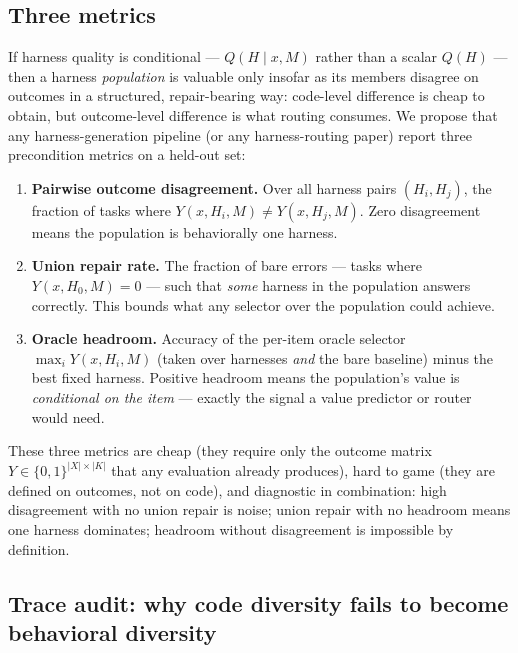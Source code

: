 \subsection{Three metrics}\label{three-metrics}
If harness quality is conditional --- \(Q(H \mid x, M)\) rather than a
scalar \(Q(H)\) --- then a harness \emph{population} is valuable only
insofar as its members disagree on outcomes in a structured,
repair-bearing way: code-level difference is cheap to obtain, but
outcome-level difference is what routing consumes. We propose that any
harness-generation pipeline (or any harness-routing paper) report three
precondition metrics on a held-out set:
\begin{enumerate}
\def\labelenumi{\arabic{enumi}.}
\tightlist
\item
  \textbf{Pairwise outcome disagreement.} Over all harness pairs
  \((H_i, H_j)\), the fraction of tasks where
  \(Y(x,H_i,M) \neq Y(x,H_j,M)\). Zero disagreement means the population
  is behaviorally one harness.
\item
  \textbf{Union repair rate.} The fraction of bare errors --- tasks
  where \(Y(x,H_0,M)=0\) --- such that \emph{some} harness in the
  population answers correctly. This bounds what any selector over the
  population could achieve.
\item
  \textbf{Oracle headroom.} Accuracy of the per-item oracle selector
  \(\max_i Y(x,H_i,M)\) (taken over harnesses \emph{and} the bare
  baseline) minus the best fixed harness. Positive headroom means the
  population's value is \emph{conditional on the item} --- exactly the
  signal a value predictor or router would need.
\end{enumerate}
These three metrics are cheap (they require only the outcome matrix
\(Y \in \{0,1\}^{|X| \times |K|}\) that any evaluation already
produces), hard to game (they are defined on outcomes, not on code), and
diagnostic in combination: high disagreement with no union repair is
noise; union repair with no headroom means one harness dominates;
headroom without disagreement is impossible by definition.
\subsection{Trace audit: why code diversity fails to become
behavioral
diversity}\label{trace-audit-why-code-diversity-fails-to-become-behavioral-diversity}


